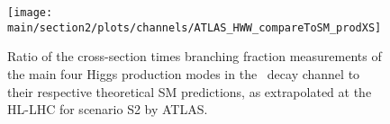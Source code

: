 \begin{figure}
  \centering
  \texttt{[image: \\main/section2/plots/channels/ATLAS\_HWW\_compareToSM\_prodXS]}
  \caption{Ratio of the cross-section times branching fraction measurements of the main four Higgs production modes in the \HWW\ decay channel to their respective theoretical SM predictions, as extrapolated at the HL-LHC for scenario S2 by ATLAS.}
  \label{fig:HWW_ATLAS_HLLHC_S2}
\end{figure}
